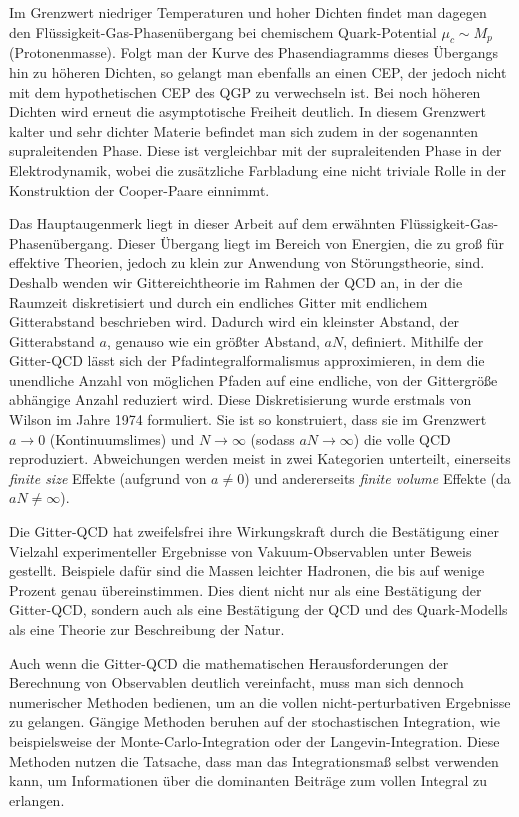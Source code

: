 Im Grenzwert niedriger Temperaturen und hoher Dichten findet man dagegen den
Flüssigkeit-Gas-Phasenübergang bei chemischem Quark-Po\-ten\-ti\-al $\mu_c \sim
M_p$ (Protonenmasse). Folgt man der Kurve des Phasendiagramms dieses Übergangs
hin zu höheren Dichten, so gelangt man ebenfalls an einen CEP, der jedoch nicht
mit dem hypothetischen CEP des QGP zu verwechseln ist. Bei noch höheren Dichten
wird erneut die asymptotische Freiheit deutlich. In diesem Grenzwert kalter und
sehr dichter Materie befindet man sich zudem in der sogenannten supraleitenden
Phase. Diese ist vergleichbar mit der supraleitenden Phase in der
Elektrodynamik, wobei die zusätzliche Farbladung eine nicht triviale Rolle in
der Konstruktion der Cooper-Paare einnimmt.

Das Hauptaugenmerk liegt in dieser Arbeit auf dem erwähnten
Flüssigkeit-Gas-\-Pha\-sen\-über\-gang. Dieser Übergang liegt im Bereich von Energien,
die zu groß für effektive Theorien, jedoch zu klein zur Anwendung von
Stö\-rungs\-theo\-rie, sind. Deshalb wenden wir Gittereichtheorie im Rahmen der
QCD an, in der die Raumzeit diskretisiert und durch ein endliches Gitter mit
endlichem Gitterabstand beschrieben wird. Dadurch wird ein kleinster Abstand,
der Gitterabstand $a$, genauso wie ein größter Abstand, $a N$, definiert.
Mithilfe der Gitter-QCD lässt sich der Pfadintegralformalismus approximieren, in
dem die unendliche Anzahl von möglichen Pfaden auf eine endliche, von der
Gittergröße abhängige Anzahl reduziert wird. Diese Diskretisierung wurde
erstmals von Wilson im Jahre 1974 formuliert. Sie ist so konstruiert, dass sie
im Grenzwert $a \to 0$ (Kontinuumslimes) und $N \to \infty$ (sodass $a N \to
\infty$) die volle QCD reproduziert. Abweichungen werden meist in zwei
Kategorien unterteilt, einerseits \emph{finite size} Effekte (aufgrund von $a
\neq 0$) und andererseits \emph{finite volume} Effekte (da $a N \neq \infty$).

Die Gitter-QCD hat zweifelsfrei ihre Wirkungskraft durch die Bestätigung einer
Viel\-zahl experimenteller Ergebnisse von Vakuum-Observablen unter Beweis
gestellt. Bei\-spie\-le dafür sind die Massen leichter Hadronen, die bis auf wenige
Prozent genau übereinstimmen. Dies dient nicht nur als eine Bestätigung der
Gitter-QCD, sondern auch als eine Bestätigung der QCD und des Quark-Modells als
eine Theorie zur Beschreibung der Natur.

Auch wenn die Gitter-QCD die mathematischen Herausforderungen der Be\-rech\-nung
von Observablen deutlich vereinfacht, muss man sich dennoch numerischer Methoden
bedienen, um an die vollen nicht-perturbativen Ergebnisse zu gelangen. Gängige
Methoden beruhen auf der stochastischen Integration, wie beispielsweise der
Monte-Carlo-Integration oder der Langevin-Integration. Diese Methoden nutzen die
Tatsache, dass man das Integrationsmaß selbst verwenden kann, um Informationen
über die dominanten Beiträge zum vollen Integral zu erlangen.

